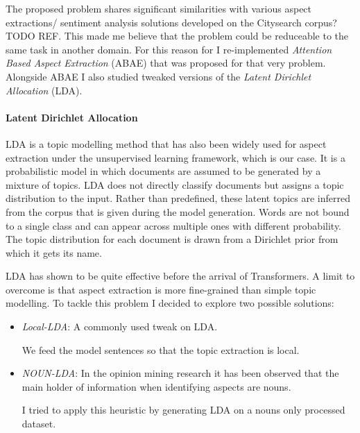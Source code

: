 The proposed problem shares significant similarities with various aspect extractions/ sentiment analysis solutions
developed on the Citysearch corpus?TODO REF. This made me believe that the problem could be reduceable to the same task
in another domain.
For this reason for I re-implemented \textit{Attention Based Aspect Extraction}  (ABAE)\cite{he-etal-2017-unsupervised}
that was proposed for that very problem.
Alongside ABAE I also studied tweaked versions of the \textit{Latent Dirichlet Allocation} (LDA).

\paragraph{Latent Dirichlet Allocation}
LDA is a topic modelling method that has also been widely used for aspect extraction under the unsupervised learning framework,
which is our case.
It is a probabilistic model in which documents are assumed to be generated by a mixture of topics.
LDA does not directly classify documents but assigns a topic distribution to the input.
Rather than predefined, these latent topics are inferred from the corpus that is given during the model generation.
Words are not bound to a single class and can appear across multiple ones with different probability.
The topic distribution for each document is drawn from a Dirichlet prior from which it gets its name.

LDA has shown to be quite effective before the arrival of Transformers. A limit to overcome is that aspect extraction
is more fine-grained than simple topic modelling.
To tackle this problem I decided to explore two possible solutions:
\begin{itemize}
    \item{\textit{Local-LDA}}: A commonly used tweak on LDA.

    We feed the model sentences so that the topic extraction is local.
    \item{\textit{NOUN-LDA}}: In the opinion mining research it has been observed that %
    the main holder of information when identifying aspects are nouns.

    I tried to apply this heuristic by generating LDA on a nouns only processed dataset.
\end{itemize}

